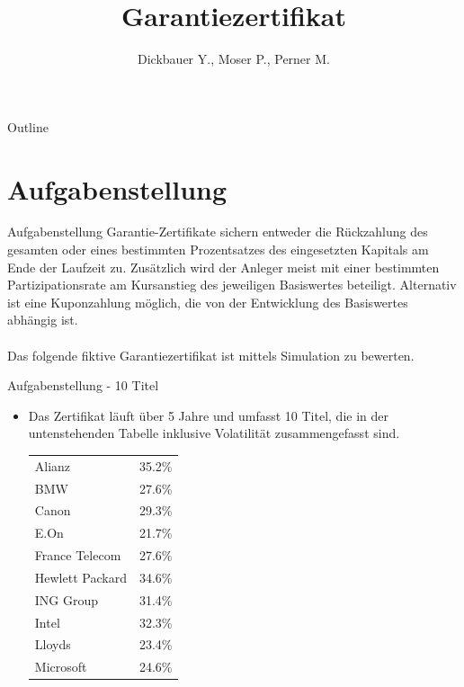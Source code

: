 

\title[BSP24 - Garantiezertifikat]{Garantiezertifikat}
\author{Dickbauer Y., Moser P., Perner M.}



\begin{frame}
  \titlepage
\end{frame}

\begin{frame}{Outline}
  \tableofcontents
\end{frame}

\section{Aufgabenstellung}
\begin{frame}{Aufgabenstellung}
Garantie-Zertifikate sichern entweder die Rückzahlung des gesamten oder eines bestimmten Prozentsatzes des eingesetzten Kapitals am Ende der Laufzeit zu. Zusätzlich wird der Anleger meist mit einer bestimmten Partizipationsrate am Kursanstieg des jeweiligen Basiswertes beteiligt. Alternativ ist eine Kuponzahlung möglich, die von der Entwicklung des Basiswertes abhängig ist.
\\~\\
Das folgende fiktive Garantiezertifikat ist mittels Simulation zu bewerten.
\end{frame}


\begin{frame}{Aufgabenstellung - 10 Titel}
\begin{itemize}
	\item Das Zertifikat läuft über 5 Jahre und umfasst 10 Titel, die in der untenstehenden Tabelle inklusive Volatilität zusammengefasst sind.
	\vspace{.2cm}
	\begin{center}
	\begin{tabular}{l|l}
	Alianz	 		& 35.2\% \\ 
	BMW 			& 27.6\% \\ 
	Canon 			& 29.3\% \\ 
	E.On			& 21.7\% \\ 
	France Telecom	& 27.6\% \\ 
	Hewlett Packard & 34.6\% \\ 
	ING Group 		& 31.4\% \\ 
	Intel 			& 32.3\% \\ 
	Lloyds 			& 23.4\% \\ 
	Microsoft		& 24.6\% \\  
	\end{tabular} 
	\end{center}
\end{itemize}
\end{frame}

